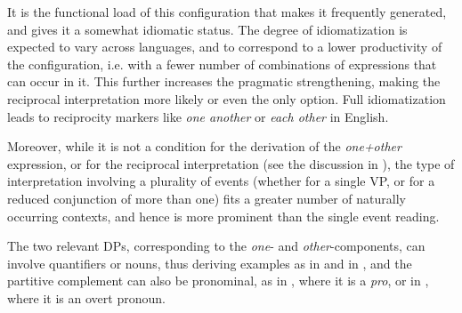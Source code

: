 \documentclass[output=paper,colorlinks,citecolor=brown]{langscibook}
\begin{document}
%
%
%


It is the functional load of this configuration that makes it frequently generated, and gives it a somewhat idiomatic status. The degree of idiomatization is expected to vary across languages, and to correspond to a lower productivity of the configuration, i.e. with a fewer number of combinations of expressions that can occur in it. This further increases the pragmatic strengthening, making the reciprocal interpretation more likely or even the only option. Full idiomatization leads to reciprocity markers like \textit{one another} or \textit{each other} in English. 

Moreover, while it is not a condition for the derivation of the \textit{one+other} expression, or for the reciprocal interpretation (see the discussion in ), the type of interpretation involving a plurality of events (whether for a single VP, or for a reduced conjunction of more than one) fits a greater number of naturally occurring contexts, and hence is more prominent than the single event reading.

The two relevant DPs, corresponding to the \textit{one}- and \textit{other}-components, can involve quantifiers or nouns, thus deriving examples as in  and in , and the partitive complement can also be pronominal, as in , where it is a \textit{pro}, or in , where it is an overt pronoun.

\ea\label{Oni}
 \label{ex:Oni-a} 

  \label{ex:Oni-b}
\z \z
\end{document}
